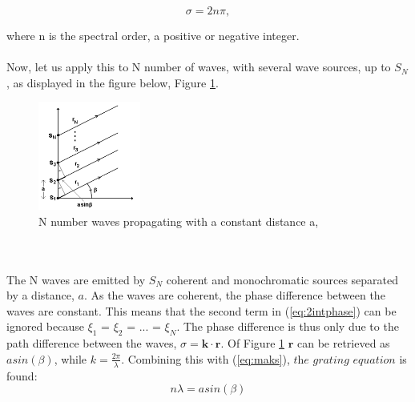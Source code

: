 \begin{equation}
    \sigma = 2 n \pi,
    \label{eq:maks}
\end{equation}

where n is the spectral order, a positive or negative integer. 
\\\\
Now, let us apply this to N number of waves, with several wave sources, up to $S_N$, as displayed in the figure below, Figure \ref{fig:Ninterference}.
\begin{figure}[h]
  \centering
    \includegraphics[width=0.3\textwidth]{Images/theory/Ninterference.png}
    \caption[N Propagating Waves]{N number waves propagating with a constant distance a, \cite{sigernes2018}}
    \label{fig:Ninterference}
\end{figure}
\\\\
The N waves are emitted by $S_N$ coherent and monochromatic sources separated by a distance, $a$. As the waves are coherent, the phase difference between the waves are constant. This means that the second term in (\ref{eq:2intphase}) can be ignored because $\xi_1$ = $\xi_2$ = ... = $\xi_N$. The phase difference is thus only due to the path difference between the waves, $\sigma = \textbf{k} \cdot \textbf{r}$. Of Figure \ref{fig:Ninterference}
$\textbf{r}$ can be retrieved as $a sin (\beta)$, while $k= \frac{2 \pi}{\lambda}$. Combining this with (\ref{eq:maks}), $\textit{the grating equation}$ is found: 
\begin{equation}
    n \lambda = a sin(\beta)
    \label{eq:transgrating}
\end{equation}

